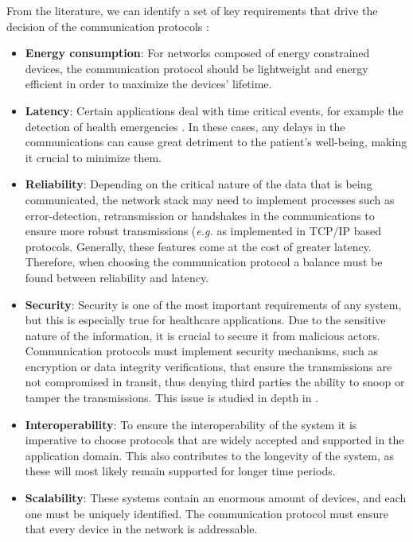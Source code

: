 From the literature, we can identify a set of key requirements that drive the decision of the communication protocols \cite{Catarinucci2015, Adame2018}:

\begin{itemize}
    \item \textbf{Energy consumption}: For networks composed of energy constrained devices, the communication protocol should be lightweight and energy efficient in order to maximize the devices' lifetime. 
    \item \textbf{Latency}: Certain applications deal with time critical events, for example the detection of health emergencies \cite{Catarinucci2015}. In these cases, any delays in the communications can cause great detriment to the patient's well-being, making it crucial to minimize them.
    \item \textbf{Reliability}: Depending on the critical nature of the data that is being communicated, the network stack may need to implement processes such as error-detection, retransmission or handshakes in the communications to ensure more robust transmissions (\textit{e.g.} as implemented in TCP/IP based protocols. Generally, these features come at the cost of greater latency. Therefore, when choosing the communication protocol a balance must be found between reliability and latency.
    \item \textbf{Security}: Security is one of the most important requirements of any system, but this is especially true for healthcare applications. Due to the sensitive nature of the information, it is crucial to secure it from malicious actors. Communication protocols must implement security mechanisms, such as encryption or data integrity verifications, that ensure the transmissions are not compromised in transit, thus denying third parties the ability to snoop or tamper the transmissions. This issue is studied in depth in \cite{Gope2016}.
    \item \textbf{Interoperability}: To ensure the interoperability of the system it is imperative to choose protocols that are widely accepted and supported in the application domain. This also contributes to the longevity of the system, as these will most likely remain supported for longer time periods. 
    \item \textbf{Scalability}: These systems contain an enormous amount of devices, and each one must be uniquely identified. The communication protocol must ensure that every device in the network is addressable.

\end{itemize}


